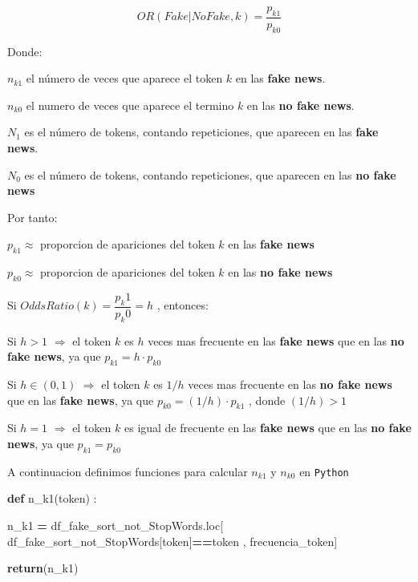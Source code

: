 \documentclass[
  11pt,
  a4paper,
]{article}
\newenvironment{Shaded}{\begin{snugshade}}{\end{snugshade}}
\newcommand{\ControlFlowTok}[1]{\textcolor[rgb]{0.13,0.29,0.53}{\textbf{#1}}}
\newcommand{\KeywordTok}[1]{\textcolor[rgb]{0.13,0.29,0.53}{\textbf{#1}}}
\newcommand{\NormalTok}[1]{#1}
\newcommand{\OperatorTok}[1]{\textcolor[rgb]{0.81,0.36,0.00}{\textbf{#1}}}
\newcommand{\StringTok}[1]{\textcolor[rgb]{0.31,0.60,0.02}{#1}}
\begin{document}
\[OR(Fake|NoFake , k) = \dfrac{ p_{k1} }{ p_{k0} }\]

Donde:

\(n_{k1}\) el número de veces que aparece el token \(k\) en las
\textbf{fake news}.

\(n_{k0}\) el numero de veces que aparece el termino \(k\) en las
\textbf{no fake news}.

\(N_1\) es el número de tokens, contando repeticiones, que aparecen en
las \textbf{fake news}.

\(N_0\) es el número de tokens, contando repeticiones, que aparecen en
las \textbf{no fake news}

Por tanto:

\(p_{k1} \approx\) proporcion de apariciones del token \(k\) en las
\textbf{fake news}

\(p_{k0} \approx\) proporcion de apariciones del token \(k\) en las
\textbf{no fake news}

Si \(OddsRatio(k) = \dfrac{ p_k1 }{ p_k0 } = h\) , entonces:

Si \(h>1\) \(\Rightarrow\) el token \(k\) es \(h\) veces mas frecuente
en las \textbf{fake news} que en las \textbf{no fake news}, ya que
\(p_{k1} = h \cdot p_{k0}\)

Si \(h \in (0 , 1)\) \(\Rightarrow\) el token \(k\) es \(1/h\) veces mas
frecuente en las \textbf{no fake news} que en las \textbf{fake news}, ya
que \(p_{k0} = (1/h) \cdot p_{k1}\) , donde \((1/h)>1\)

Si \(h= 1\) \(\Rightarrow\) el token \(k\) es igual de frecuente en las
\textbf{fake news} que en las \textbf{no fake news}, ya que
\(p_{k1} = p_{k0}\)

A continuacion definimos funciones para calcular \(n_{k1}\) y \(n_{k0}\)
en \texttt{Python}

\begin{Shaded}
\begin{Highlighting}[]
\KeywordTok{def}\NormalTok{ n\_k1(token) : }

\NormalTok{    n\_k1 }\OperatorTok{=}\NormalTok{ df\_fake\_sort\_not\_StopWords.loc[ df\_fake\_sort\_not\_StopWords[}\StringTok{\textquotesingle{}token\textquotesingle{}}\NormalTok{]}\OperatorTok{==}\NormalTok{token , }\StringTok{\textquotesingle{}frecuencia\_token\textquotesingle{}}\NormalTok{]}

    \ControlFlowTok{return}\NormalTok{(n\_k1)}
\end{Highlighting}
\end{Shaded}
\end{document}
